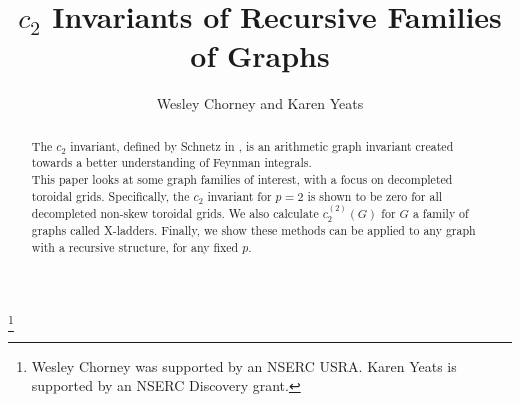 \documentclass[12pt]{amsart}
\title{$c_2$ Invariants of Recursive Families of Graphs}
\author{Wesley Chorney and Karen Yeats}
\numberwithin{definition}{section}
\begin{document}
\thanks{Wesley Chorney was supported by an NSERC USRA.  Karen Yeats is supported by an NSERC Discovery grant.}

\begin{abstract}
The $c_2$ invariant, defined by Schnetz in \cite{Schnetz2011}, is an arithmetic graph invariant created towards a better understanding of Feynman integrals. \\
This paper looks at some graph families of interest, with a focus on decompleted toroidal grids. Specifically, the $c_2$ invariant for $p=2$ is shown to be zero for all decompleted non-skew toroidal grids.  We also calculate $c_2^{(2)}(G)$ for $G$ a family of graphs called X-ladders. Finally, we show these methods can be applied to any graph with a recursive structure, for any fixed $p$.
\end{abstract} 
\maketitle
\end{document}
